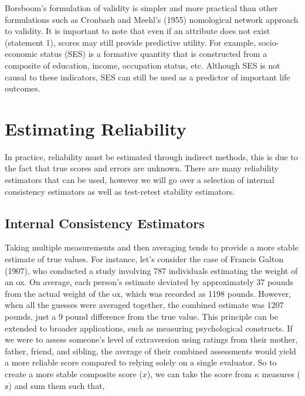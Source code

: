 \documentclass[
  letterpaper,
  DIV=11,
  numbers=noendperiod]{scrreprt}
\begin{document}
Borsboom's formulation of validity is simpler and more practical than
other formulations such as Cronbach and Meehl's (1955) nomological
network approach to validity. It is important to note that even if an
attribute does not exist (statement 1), scores may still provide
predictive utility. For example, socio-economic status (SES) is a
formative quantity that is constructed from a composite of education,
income, occupation status, etc. Although SES is not causal to these
indicators, SES can still be used as a predictor of important life
outcomes.

\hypertarget{estimating-reliability}{%
\section{Estimating Reliability}\label{estimating-reliability}}

In practice, reliability must be estimated through indirect methods,
this is due to the fact that true scores and errors are unknown. There
are many reliability estimators that can be used, however we will go
over a selection of internal consistency estimators as well as
test-retest stability estimators.

\hypertarget{internal-consistency-estimators}{%
\subsection{Internal Consistency
Estimators}\label{internal-consistency-estimators}}

Taking multiple measurements and then averaging tends to provide a more
stable estimate of true values. For instance, let's consider the case of
Francis Galton (1907), who conducted a study involving 787 individuals
estimating the weight of an ox. On average, each person's estimate
deviated by approximately 37 pounds from the actual weight of the ox,
which was recorded as 1198 pounds. However, when all the guesses were
averaged together, the combined estimate was 1207 pounds, just a 9 pound
difference from the true value. This principle can be extended to
broader applications, such as measuring psychological constructs. If we
were to assess someone's level of extraversion using ratings from their
mother, father, friend, and sibling, the average of their combined
assessments would yield a more reliable score compared to relying solely
on a single evaluator. So to create a more stable composite score
(\(x\)), we can take the score from \(\kappa\) measures (\(\mathbb{x}\))
and sum them such that,
\end{document}

